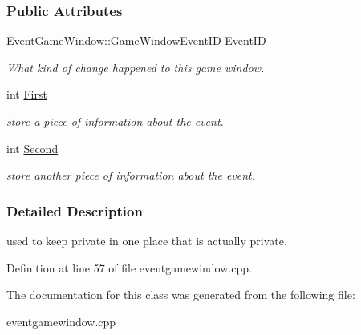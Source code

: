 \subsubsection*{Public Attributes}
\begin{DoxyCompactItemize}
\item 
\hypertarget{classphys_1_1EventGameWindowData_aee5633e59e1f147d001d04e98a4f53a0}{
\hyperlink{classphys_1_1EventGameWindow_a45225255070513d3cff88cdfea25cc09}{EventGameWindow::GameWindowEventID} \hyperlink{classphys_1_1EventGameWindowData_aee5633e59e1f147d001d04e98a4f53a0}{EventID}}
\label{d1/d45/classphys_1_1EventGameWindowData_aee5633e59e1f147d001d04e98a4f53a0}

\begin{DoxyCompactList}\small\item\em What kind of change happened to this game window. \item\end{DoxyCompactList}\item 
\hypertarget{classphys_1_1EventGameWindowData_ac21fb863e39f60821ea8017025884078}{
int \hyperlink{classphys_1_1EventGameWindowData_ac21fb863e39f60821ea8017025884078}{First}}
\label{d1/d45/classphys_1_1EventGameWindowData_ac21fb863e39f60821ea8017025884078}

\begin{DoxyCompactList}\small\item\em store a piece of information about the event. \item\end{DoxyCompactList}\item 
\hypertarget{classphys_1_1EventGameWindowData_ae4d7e70e2539f90dc18272bc092b711e}{
int \hyperlink{classphys_1_1EventGameWindowData_ae4d7e70e2539f90dc18272bc092b711e}{Second}}
\label{d1/d45/classphys_1_1EventGameWindowData_ae4d7e70e2539f90dc18272bc092b711e}

\begin{DoxyCompactList}\small\item\em store another piece of information about the event. \item\end{DoxyCompactList}\end{DoxyCompactItemize}


\subsubsection{Detailed Description}
used to keep private in one place that is actually private. 

Definition at line 57 of file eventgamewindow.cpp.



The documentation for this class was generated from the following file:\begin{DoxyCompactItemize}
\item 
eventgamewindow.cpp\end{DoxyCompactItemize}
